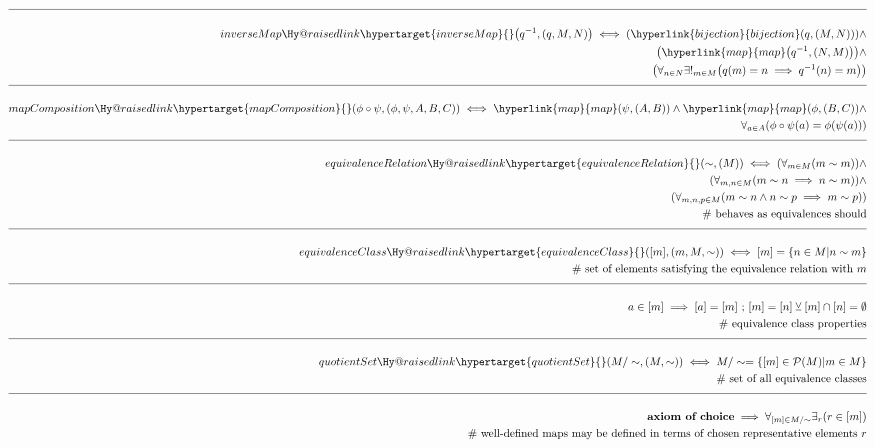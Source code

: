 \documentclass[a4paper]{article}
\makeatletter
\def\ml{\mleft}
\def\mr{\mright}
\newcommand{\eqComment}[1]{\text{  \# #1}}
\newcommand{\eqSep}{\text{ ;  }}
\newcommand{\n}{\\[1.5ex] \hline \nonumber \\[0ex]}
\newcommand{\m}{\nonumber \\}
\newcommand{\labeltarget}[1]{\Hy@raisedlink{\hypertarget{#1}{}}}
\newcommand{\dfn}[1]{#1\labeltarget{#1}}
\newcommand{\rfr}[1]{\hyperlink{#1}{#1}}
\makeatother
\begin{document}
\begin{tcolorbox}
\begin{align}
\n \dfn{inverseMap}\ml(q^{-1}, \ml(q, M, N\mr)\mr) \iff \ml(\rfr{bijection}\ml(q, \ml(M, N\mr)\mr)\mr) \land
\m \ml(\rfr{map}\ml(q^{-1}, \ml(N, M\mr)\mr)\mr) \land
\m \ml(\forall_{n \in N} \exists!_{m \in M} \ml(q\ml(m\mr) = n \implies q^{-1}\ml(n\mr) = m\mr)\mr)
\n \dfn{mapComposition}\ml(\phi \circ \psi, \ml(\phi, \psi, A, B, C\mr)\mr) \iff \rfr{map}\ml(\psi, \ml(A, B\mr)\mr) \land \rfr{map}\ml(\phi, \ml(B, C\mr)\mr) \land
\m \forall_{a \in A} \ml(\phi \circ \psi\ml(a\mr) = \phi\ml(\psi\ml(a\mr)\mr)\mr)
\n \dfn{equivalenceRelation}\ml(\sim, \ml(M\mr)\mr) \iff \ml(\forall_{m \in M} \ml(m \sim m\mr)\mr) \land
\m \ml(\forall_{m, n \in M} \ml(m \sim n \implies n \sim m\mr)\mr) \land
\m \ml(\forall_{m, n, p \in M} \ml(m \sim n \land n \sim p \implies m \sim p\mr)\mr)
\m \eqComment{behaves as equivalences should}
\n \dfn{equivalenceClass}\ml([m], \ml(m, M, \sim\mr)\mr) \iff [m] = \{n \in M| n \sim m\}
\m \eqComment{set of elements satisfying the equivalence relation with $m$}
\n a \in [m] \implies [a] = [m] \eqSep [m] = [n] \veebar [m] \cap [n] = \emptyset
\m \eqComment{equivalence class properties}
\n \dfn{quotientSet}\ml(M / \sim, \ml(M, \sim\mr)\mr) \iff M / \sim = \{[m] \in \mathcal{P}\ml(M\mr) | m \in M\}
\m \eqComment{set of all equivalence classes}
\n \textbf{axiom of choice} \implies \forall_{[m] \in M / \sim} \exists_r \ml(r \in [m]\mr)
\m \eqComment{well-defined maps may be defined in terms of chosen representative elements $r$}
\end{align}
\end{tcolorbox}
\end{document}

